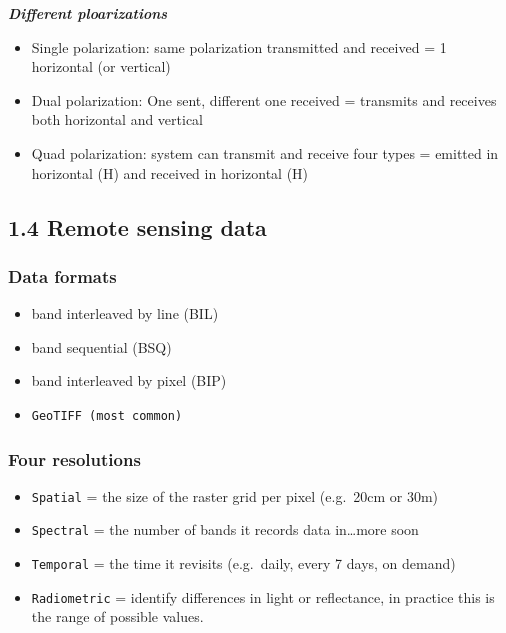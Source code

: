 \documentclass[
  letterpaper,
  DIV=11,
  numbers=noendperiod]{scrreprt}
\providecommand{\tightlist}{%
  \setlength{\itemsep}{0pt}\setlength{\parskip}{0pt}}\usepackage{longtable,booktabs,array}
\begin{document}
\textbf{\emph{Different ploarizations}}

\begin{itemize}
\tightlist
\item
  Single polarization: same polarization transmitted and received = 1
  horizontal (or vertical)
\item
  Dual polarization: One sent, different one received = transmits and
  receives both horizontal and vertical
\item
  Quad polarization: system can transmit and receive four types =
  emitted in horizontal (H) and received in horizontal (H)
\end{itemize}

\hypertarget{remote-sensing-data}{%
\subsection*{\texorpdfstring{\textbf{1.4 Remote sensing
data}}{1.4 Remote sensing data}}\label{remote-sensing-data}}

\hypertarget{data-formats}{%
\subsubsection*{\texorpdfstring{\textbf{Data
formats}}{Data formats}}\label{data-formats}}

\begin{itemize}
\tightlist
\item
  band interleaved by line (BIL)
\item
  band sequential (BSQ)
\item
  band interleaved by pixel (BIP)
\item
  \texttt{GeoTIFF\ (most\ common)}
\end{itemize}

\hypertarget{four-resolutions}{%
\subsubsection*{\texorpdfstring{\textbf{Four
resolutions}}{Four resolutions}}\label{four-resolutions}}

\begin{itemize}
\tightlist
\item
  \texttt{Spatial} = the size of the raster grid per pixel (e.g.~20cm or
  30m)
\item
  \texttt{Spectral} = the number of bands it records data in\ldots more
  soon
\item
  \texttt{Temporal} = the time it revisits (e.g.~daily, every 7 days, on
  demand)
\item
  \texttt{Radiometric} = identify differences in light or reflectance,
  in practice this is the range of possible values.
\end{itemize}
\end{document}
